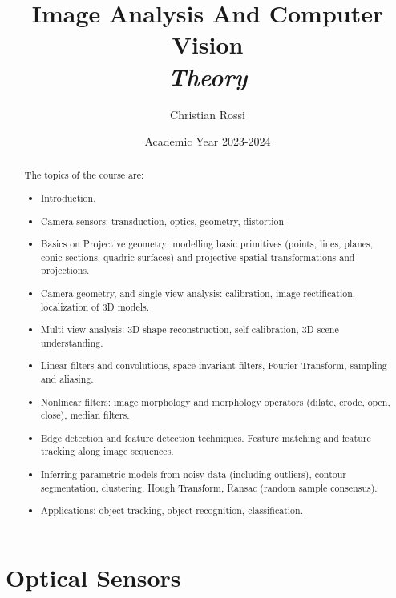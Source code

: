 \documentclass[12pt, a4paper]{report}
\title{Image Analysis And Computer Vision\\ \textit{Theory}}
\author{Christian Rossi}
\date{Academic Year 2023-2024}
\newtheorem[style=M,bodystyle=\normalfont]{theorem}{Theorem}
\newtheorem[style=M,bodystyle=\normalfont]{corollary}{Corollary}
\newtheorem[style=M,bodystyle=\normalfont]{lemma}{Lemma}
\newtheorem[style=M,bodystyle=\normalfont]{definition}{Definition}
\begin{document}
\maketitle

\newpage

\begin{abstract}
    The topics of the course are: 
    \begin{itemize}
        \item Introduction.
        \item Camera sensors: transduction, optics, geometry, distortion
        \item Basics on Projective geometry: modelling basic primitives (points, lines, planes, conic sections, quadric surfaces) and projective spatial transformations and  projections.
        \item Camera geometry, and single view analysis: calibration, image rectification, localization of 3D models.
        \item Multi-view analysis: 3D shape reconstruction, self-calibration, 3D scene understanding.
        \item Linear filters and convolutions, space-invariant filters, Fourier Transform, sampling and aliasing. 
        \item Nonlinear filters: image morphology and morphology operators (dilate, erode, open, close), median filters.
        \item Edge detection and feature detection techniques. Feature matching and feature tracking along image sequences.
        \item Inferring parametric models from noisy data (including outliers), contour segmentation, clustering, Hough Transform, Ransac (random sample consensus). 
        \item Applications: object tracking, object recognition, classification.
    \end{itemize}
\end{abstract}

\newpage

\tableofcontents

\newpage

\chapter{Optical Sensors}
\end{document}
